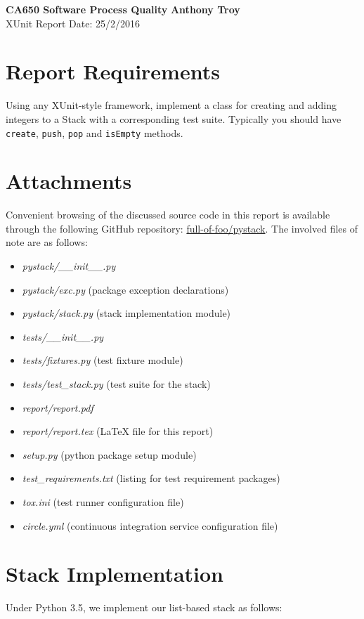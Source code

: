 \documentclass[a4paper, 11pt]{article}
\begin{document}
\noindent
\large\textbf{CA650 Software Process Quality}  \hfill \textbf{Anthony Troy} \\
\normalsize XUnit Report \hfill Date: 25/2/2016

\section*{Report Requirements}
Using any XUnit-style framework, implement a class for creating and adding integers to a Stack with a corresponding test suite. Typically you should have \lstinline$create$,  \lstinline$push$,  \lstinline$pop$ and  \lstinline$isEmpty$ methods.

\section*{Attachments}
Convenient browsing of the discussed source code in this report is available through the following GitHub repository: \href{https://github.com/full-of-foo/pystack}{full-of-foo/pystack}. The involved files of note
are as follows:
	\begin{itemize}
		\item \textit{pystack/\_\_init\_\_.py}
		\item \textit{pystack/exc.py} (package exception declarations) 
		\item \textit{pystack/stack.py} (stack implementation module)
		\item \textit{tests/\_\_init\_\_.py}
		\item \textit{tests/fixtures.py} (test fixture module)
		\item \textit{tests/test\_stack.py} (test suite for the stack)
		\item \textit{report/report.pdf}
		\item \textit{report/report.tex} (LaTeX file for this report)
		\item \textit{setup.py} (python package setup module)
		\item \textit{test\_requirements.txt} (listing for test requirement packages)
		\item \textit{tox.ini} (test runner configuration file)
		\item \textit{circle.yml} (continuous integration service configuration file) 
\end{itemize}	
\section*{Stack Implementation}
Under Python 3.5, we implement our  list-based stack as follows:
\\

\end{document}
